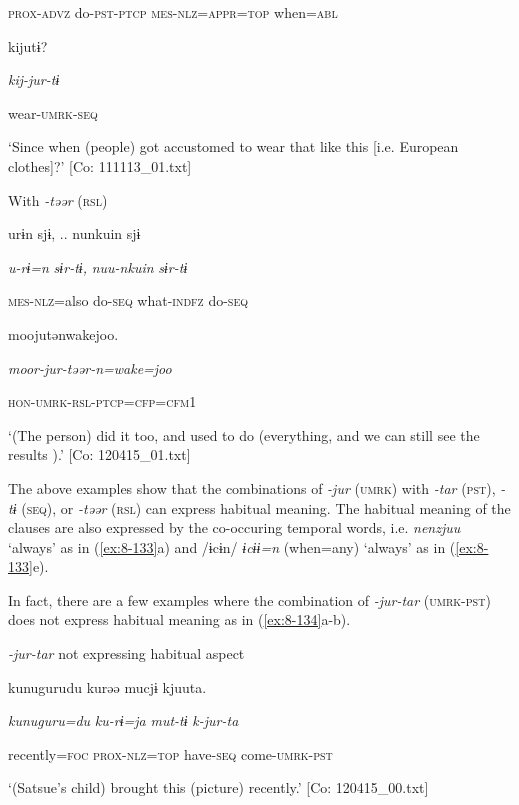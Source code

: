       \textsc{prox}-\textsc{advz}  do-\textsc{pst}-\textsc{ptcp}  \textsc{mes}-\textsc{nlz}=\textsc{appr}=\textsc{top}  when=\textsc{abl}

      kijutɨ?

      \textit{kij-jur-tɨ}

      wear-\textsc{umrk}-\textsc{seq}

\glt ‘Since when (people) got accustomed to wear that like this [i.e. European clothes]?’ [Co: 111113\_01.txt]
\z

  With \textit{{}-təər} (\textsc{rsl})

\ex {\TM}
\glll  urɨn  sjɨ, ..  nunkuin  sjɨ

      \textit{u-rɨ=n}  \textit{sɨr-tɨ,}  \textit{nuu-nkuin}  \textit{sɨr-tɨ}

      \textsc{mes}-\textsc{nlz}=also  do-\textsc{seq}  what-\textsc{indfz}  do-\textsc{seq}

      moojutənwakejoo.

      \textit{moor-jur-təər{}-n=wake=joo}

      \textsc{hon}-\textsc{umrk}-\textsc{rsl}-\textsc{ptcp}=\textsc{cfp}=\textsc{cfm1}

\glt ‘(The person) did it too, and used to do (everything, and we can still see the results ).’ [Co: 120415\_01.txt]
\z

The above examples show that the combinations of \textit{{}-jur} (\textsc{umrk}) with \textit{{}-tar} (\textsc{pst}), \textit{{}-tɨ} (\textsc{seq}), or \textit{{}-təər} (\textsc{rsl}) can express habitual meaning. The habitual meaning of the clauses are also expressed by the co-occuring temporal words, i.e. \textit{nenzjuu} ‘always’ as in (\ref{ex:8-133}a) and /ɨcɨn/ \textit{ɨcɨɨ=n} (when=any) ‘always’ as in (\ref{ex:8-133}e).

  In fact, there are a few examples where the combination of \textit{{}-jur-tar} (\textsc{umrk}-\textsc{pst}) does not express habitual meaning as in (\ref{ex:8-134}a-b).

\ea\label{ex:8-134}
  \textit{{}-jur-tar} not expressing habitual aspect

\ea {\TM}
\glll  kunugurudu  kurəə  mucjɨ  kjuuta.

      \textit{kunuguru=du}  \textit{ku-rɨ=ja}  \textit{mut-tɨ}  \textit{k-jur-ta}

      recently=\textsc{foc}  \textsc{prox}-\textsc{nlz}=\textsc{top}  have-\textsc{seq}  come-\textsc{umrk}-\textsc{pst}

\glt ‘(Satsue’s child) brought this (picture) recently.’ [Co: 120415\_00.txt]

